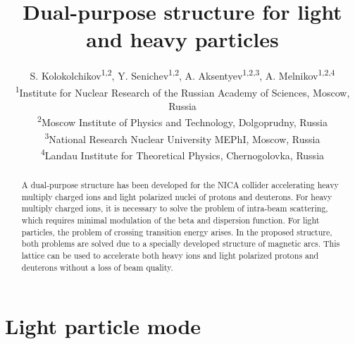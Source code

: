 \documentclass[a4paper,
               keeplastbox,   %
               ]{jacow}
\begin{document}
\title{Dual-purpose structure for light and heavy particles}

\author{S. Kolokolchikov\textsuperscript{1,2}, Y. Senichev\textsuperscript{1,2}, A. Aksentyev\textsuperscript{1,2,3}, A. Melnikov\textsuperscript{1,2,4} \\
\textsuperscript{1}Institute for Nuclear Research of the Russian Academy of Sciences, Moscow, Russia\\
\textsuperscript{2}Moscow Institute of Physics and Technology, Dolgoprudny, Russia\\
\textsuperscript{3}National Research Nuclear University MEPhI, Moscow, Russia\\
\textsuperscript{4}Landau Institute for Theoretical Physics, Chernogolovka, Russia\\}
	
\maketitle

%
\begin{abstract}

	\par A dual-purpose structure has been developed for the NICA collider accelerating heavy multiply charged ions and light polarized nuclei of protons and deuterons. For heavy multiply charged ions, it is necessary to solve the problem of intra-beam scattering, which requires minimal modulation of the beta and dispersion function. For light particles, the problem of crossing transition energy arises. In the proposed structure, both problems are solved due to a specially developed structure of magnetic arcs. This lattice can be used to accelerate both heavy ions and light polarized protons and deuterons without a loss of beam quality.

\end{abstract}

\section{Light particle mode}
\end{document}
